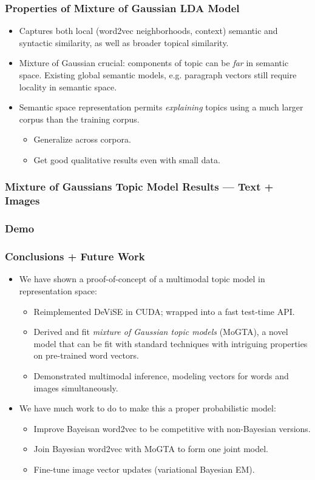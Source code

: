 \documentclass{beamer}
\begin{document}
\begin{frame}
  \frametitle{Properties of Mixture of Gaussian LDA Model}
  \begin{itemize}
    \item Captures both local (word2vec neighborhoods, context) semantic and syntactic similarity, as well as broader topical similarity.
    \item Mixture of Gaussian crucial: components of topic can be \emph{far} in semantic space. Existing global semantic models, e.g. paragraph vectors \citep{Le14q} still require locality in semantic space.
    \item Semantic space representation permits \emph{explaining} topics using a much larger corpus than the training corpus.
    \begin{itemize}
      \item Generalize across corpora.
      \item Get good qualitative results even with small data.
    \end{itemize}
        
  \end{itemize}

\end{frame}

\begin{frame}
  \frametitle{Mixture of Gaussians Topic Model Results --- Text + Images}
\end{frame}

\begin{frame}
  \frametitle{Demo}
\end{frame}

\begin{frame}
  \frametitle{Conclusions + Future Work}
  \begin{itemize}
    \item We have shown a proof-of-concept of a multimodal topic model in representation space:
    \begin{itemize}
      \item Reimplemented DeViSE in CUDA; wrapped into a fast test-time API.
      \item Derived and fit \emph{mixture of Gaussian topic models} (MoGTA), a novel model that can be fit with standard techniques with intriguing properties on pre-trained word vectors.
      \item Demonstrated multimodal inference, modeling vectors for words and images simultaneously.
    \end{itemize}
    \item We have much work to do to make this a proper probabilistic model:
    \begin{itemize}
      \item Improve Bayeisan word2vec to be competitive with non-Bayesian versions.
      \item Join Bayesian word2vec with MoGTA to form one joint model.
      \item Fine-tune image vector updates (variational Bayesian EM).
    \end{itemize}
  \end{itemize}
\end{frame}
\end{document}
